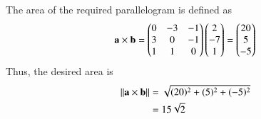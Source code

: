 
The area of the required parallelogram is defined as
\begin{align}
\mathbf{a}\times \mathbf{b} =
\begin{pmatrix}
0 & -3 & -1\\
3 & 0 & -1\\
1 & 1 & 0\end{pmatrix}
\begin{pmatrix}
2\\
-7\\
1\end{pmatrix}
=\begin{pmatrix}
20\\
5\\
-5\end{pmatrix}
\end{align}
Thus, the desired area is
\begin{align}
\left\lVert\mathbf{a}\times \mathbf{b}\right\rVert &= \sqrt{(20)^{2}+(5)^{2}+(-5)^{2}} \\
&= 15\sqrt{2}
\end{align}
